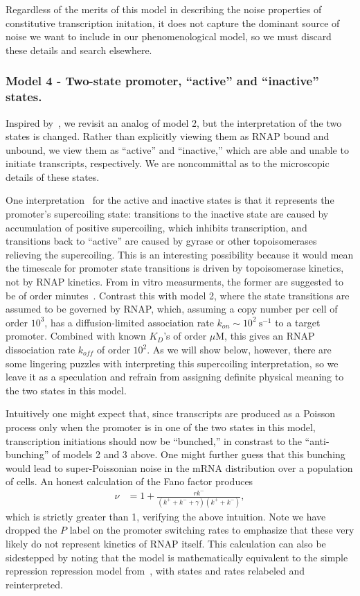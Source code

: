 \documentclass[12pt]{article}%
\begin{document}
Regardless of the merits of this model in describing the noise
properties of constitutive transcription initation, it does not
capture the dominant source of noise we want to include in our
phenomenological model, so we must discard these details and
search elsewhere.

\subsubsection{Model 4 - Two-state promoter,
``active'' and ``inactive'' states.}
Inspired by~\cite{Razo-Mejia2020}, we revisit an analog of model
2, but the interpretation of the two states is changed. Rather
than explicitly viewing them as RNAP bound and unbound, we view
them as ``active'' and ``inactive,'' which are able and unable to
initiate transcripts, respectively. We are noncommittal as to the
microscopic details of these states.

One interpretation~\cite{Chong2014, Sevier2016} for the active
and inactive states is that it represents the promoter's
supercoiling state: transitions to the inactive state are caused
by accumulation of positive supercoiling, which inhibits
transcription, and transitions back to ``active'' are caused by
gyrase or other topoisomerases relieving the supercoiling. This
is an interesting possibility because it would mean the timescale
for promoter state transitions is driven by topoisomerase
kinetics, not by RNAP kinetics. From in vitro measurments, the
former are suggested to be of order minutes~\cite{Chong2014}.
Contrast this with model 2, where the state transitions are
assumed to be governed by RNAP, which, assuming a copy number per
cell of order $10^3$, has a diffusion-limited association rate
$k_{on} \sim 10^2~\text{s}^{-1}$ to a target promoter. Combined
with known $K_D$'s of order $\mu$M, this gives an RNAP
dissociation rate $k_{off}$ of order $10^2$. As we will show
below, however, there are some lingering puzzles with
interpreting this supercoiling interpretation, so we leave it as
a speculation and refrain from assigning definite physical
meaning to the two states in this model.

Intuitively one might expect that, since transcripts are produced
as a Poisson process only when the promoter is in one of the two
states in this model, transcription initiations should now be
``bunched,'' in constrast to the ``anti-bunching'' of models 2
and 3 above. One might further guess that this bunching would
lead to super-Poissonian noise in the mRNA distribution over a
population of cells. An honest calculation of the Fano factor produces
\begin{align}
\nu &= 1 + \frac{r k^-}{(k^+ + k^- + \gamma)(k^+ + k^-)},
\end{align}
which is strictly greater than 1, verifying the above intuition.
Note we have dropped the $P$ label on the promoter switching rates to
emphasize that these very likely do not represent kinetics of RNAP itself.
This calculation can also be sidestepped by noting that the model
is mathematically equivalent to the simple repression repression model
from~\cite{Jones2014}, with states and rates relabeled and reinterpreted.
\end{document}
